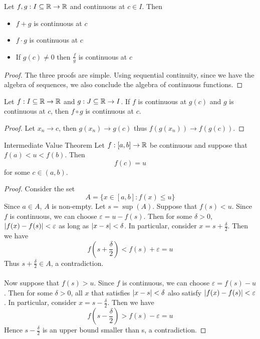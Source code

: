 \documentclass[a4paper]{article}
\begin{document}
\begin{prp}{}{} Let $f,g:I\subseteq\mathbb{R}\to\mathbb{R}$ and continuous at $c\in I$. Then
\begin{itemize}
\item $f+g$ is continuous at $c$
\item $f\cdot g$ is continuous at $c$
\item If $g(c)\neq0$ then $\frac{f}{g}$ is continuous at $c$
\end{itemize}\tcbline
\begin{proof} The three proofs are simple. Using sequential continuity, since we have the algebra of sequences, we also conclude the algebra of continuous functions. 
\end{proof}
\end{prp}

\begin{prp}{}{} Let $f:I\subseteq\mathbb{R}\to\mathbb{R}$ and $g:J\subseteq\mathbb{R}\to I$. If $f$ is continuous at $g(c)$ and $g$ is continuous at $c$, then $f\circ g$ is continuous at $c$. \tcbline
\begin{proof} Let $x_n\to c$, then $g(x_n)\to g(c)$ thus $f(g(x_n))\to f(g(c))$. 
\end{proof}
\end{prp}

\begin{thm}{Intermediate Value Theorem}{} Let $f:[a,b]\to\mathbb{R}$ be continuous and suppose that $f(a)<u<f(b)$. Then $$f(c)=u$$ for some $c\in(a,b)$.\tcbline
\begin{proof} Consider the set $$A=\{x\in[a,b]:f(x)\leq u\}$$ Since $a\in A$, $A$ is non-empty. Let $s=\sup(A)$. Suppose that $f(s)<u$. Since $f$ is continuous, we can choose $\varepsilon=u-f(s)$. Then for some $\delta>0$, $\abs{f(x)-f(s)}<\varepsilon$ as long as $\abs{x-s}<\delta$. In particular, consider $x=s+\frac{\delta}{2}$. Then we have $$f\left(s+\frac{\delta}{2}\right)<f(s)+\varepsilon=u$$ Thus $s+\frac{\delta}{2}\in A$, a contradiction. \\~\\
Now suppose that $f(s)>u$. Since $f$ is continuous, we can choose $\varepsilon=f(s)-u$. Then for some $\delta>0$, all $x$ that satisfies $\abs{x-s}<\delta$ also satisfy $\abs{f(x)-f(s)}<\varepsilon$. In particular, consider $x=s-\frac{\delta}{2}$. Then we have $$f\left(s-\frac{\delta}{2}\right)>f(s)-\varepsilon=u$$ Hence $s-\frac{\delta}{2}$ is an upper bound smaller than s, a contradiction. 
\end{proof}
\end{thm}
\end{document}
